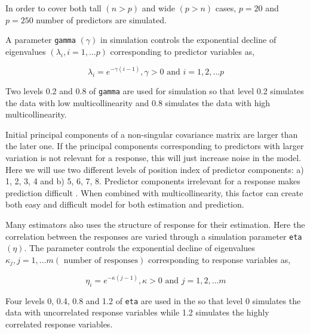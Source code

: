 \documentclass[12pt,3p,authoryear]{elsarticle}
\providecommand{\tightlist}{%
  \setlength{\itemsep}{0pt}\setlength{\parskip}{0pt}}
\begin{document}
\begin{description}
\tightlist
\item[\textbf{Number of predictors:}]
In order to cover both tall \((n>p)\) and wide \((p>n)\) cases, \(p=20\)
and \(p=250\) number of predictors are simulated.
\item[\textbf{Multicollinearity in predictor variables:}]
A parameter \texttt{gamma} \((\gamma)\) in simulation controls the
exponential decline of eigenvalues \((\lambda_i, i = 1, \ldots p)\)
corresponding to predictor variables as,

\begin{equation}
  \lambda_i = e^{-\gamma(i-1)}, \gamma > 0 \text{ and } i = 1, 2, \ldots p
  \label{eq:gamma}
  \end{equation}

Two levels 0.2 and 0.8 of \texttt{gamma} are used for simulation so that
level 0.2 simulates the data with low multicollinearity and 0.8
simulates the data with high multicollinearity.
\item[\textbf{Position of relevant components:}]
Initial principal components of a non-singular covariance matrix are
larger than the later one. If the principal components corresponding to
predictors with larger variation is not relevant for a response, this
will just increase noise in the model. Here we will use two different
levels of position index of predictor components: a) 1, 2, 3, 4 and b)
5, 6, 7, 8. Predictor components irrelevant for a response makes
prediction difficult \citep{Helland1994b}. When combined with
multicollinearity, this factor can create both easy and difficult model
for both estimation and prediction.
\item[\textbf{Correlation in response variables:}]
Many estimators also uses the structure of response for their
estimation. Here the correlation between the responses are varied
through a simulation parameter \texttt{eta} \((\eta)\). The parameter
controls the exponential decline of eigenvalues
\(\kappa_j, j = 1, \ldots m (\text{ number of responses})\)
corresponding to response variables as,

\begin{equation}
\eta_i = e^{-\kappa(j-1)}, \kappa > 0 \text{ and } j = 1, 2, \ldots m
\label{eq:eta}
\end{equation}

Four levels 0, 0.4, 0.8 and 1.2 of \texttt{eta} are used in the so that
level 0 simulates the data with uncorrelated response variables while
1.2 simulates the highly correlated response variables.
\end{description}
\end{document}
